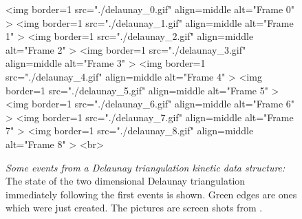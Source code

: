 \begin{figure}[htb]
\begin{ccHtmlOnly}

<img border=1 src="./delaunay_0.gif" align=middle alt="Frame 0" >
<img border=1 src="./delaunay_1.gif" align=middle alt="Frame 1" >
<img border=1 src="./delaunay_2.gif" align=middle alt="Frame 2" >
<img border=1 src="./delaunay_3.gif" align=middle alt="Frame 3" >
<img border=1 src="./delaunay_4.gif" align=middle alt="Frame 4" >
<img border=1 src="./delaunay_5.gif" align=middle alt="Frame 5" >
<img border=1 src="./delaunay_6.gif" align=middle alt="Frame 6" >
<img border=1 src="./delaunay_7.gif" align=middle alt="Frame 7" >
<img border=1 src="./delaunay_8.gif" align=middle alt="Frame 8" >
<br>
\end{ccHtmlOnly}
\caption{ \label{fig:kds_delaunay_events} 
{\em Some events from a Delaunay triangulation kinetic data
structure:} The state of the two dimensional Delaunay triangulation
immediately following the first events is shown. Green edges are ones
which were just created. The pictures are screen shots from
. }
\end{figure}


